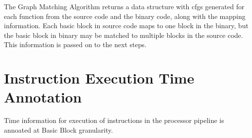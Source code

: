 The Graph Matching Algorithm returns a data structure with \gls{cfg}s generated for each function from the source code and the binary code, along with the mapping information. Each basic block in source code maps to one block in the binary, but the basic block in binary may be matched to multiple blocks in the source code. This information is passed on to the next steps.

\section{Instruction Execution Time Annotation}
Time information for execution of instructions in the processor pipeline is annoated at Basic Block granularity. 






